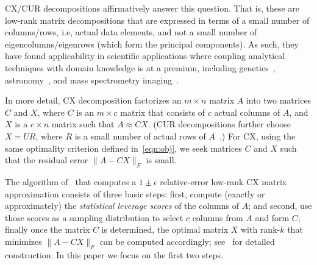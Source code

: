 CX/CUR decompositions affirmatively answer this question.  That is, these are
low-rank matrix decompositions that are expressed in terms of a small number of
columns/rows, i.e, actual data elements, and not a small number of
eigencolumns/eigenrows (which form the principal components).  As such, they
have found applicability in scientific applications where coupling analytical
techniques with domain knowledge is at a premium, including
genetics~\cite{Paschou07b}, astronomy~\cite{Yip14-AJ}, and mass spectrometry
imaging~\cite{YRPMB15}.

In more detail, CX decomposition factorizes an $m \times n$ matrix $A$ into two
matrices $C$ and $X$, where $C$ is an $m\times c$ matrix that consists of $c$
actual columns of $A$, and $X$ is a $c \times n$ matrix such that $A\approx
CX$.
(CUR decompositions further choose $X=UR$, where $R$ is a small number of actual rows
of $A$~\cite{DMM08,CUR_PNAS}.)
For CX, using the same optimality criterion defined in~\eqref{eqn:obj}, we seek
matrices $C$ and $X$ such that the residual error $\|A-CX\|_F$ is small.

The algorithm of~\cite{DMM08} that computes a $1\pm\epsilon$ relative-error
low-rank CX matrix approximation consists of three basic steps: first, compute
(exactly or approximately) the {\it statistical leverage scores} of the columns
of $A$; and second, use those scores as a sampling distribution to select $c$
columns from $A$ and form $C$; finally once the matrix $C$ is determined, the
optimal matrix $X$ with rank-$k$ that minimizes $\|A-CX\|_F$ can be computed
accordingly; see~\cite{DMM08} for detailed construction. In this paper we focus
on the first two steps.  

